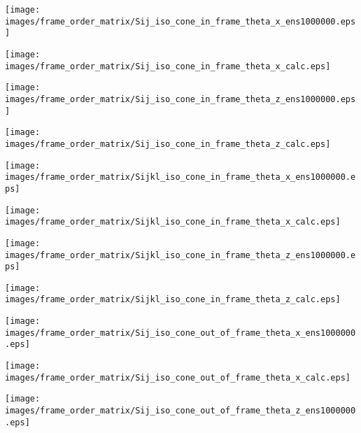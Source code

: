 \documentclass[a4paper,11pt,twoside,openright]{book}
\def\lthtmlcheckvsize{\ifdim\ht\sizebox<\vsize 
  \ifdim\wd\sizebox<\hsize\expandafter\hfill\fi \expandafter\vfill
  \else\expandafter\vss\fi}%
\begin{document}
{\newpage\clearpage
{}%
\texttt{[image: images/frame\_order\_matrix/Sij\_iso\_cone\_in\_frame\_theta\_x\_ens1000000.eps]}%
\lthtmlpictureZ
\lthtmlcheckvsize\clearpage}

{\newpage\clearpage
{}%
\texttt{[image: images/frame\_order\_matrix/Sij\_iso\_cone\_in\_frame\_theta\_x\_calc.eps]}%
\lthtmlpictureZ
\lthtmlcheckvsize\clearpage}

{\newpage\clearpage
{}%
\texttt{[image: images/frame\_order\_matrix/Sij\_iso\_cone\_in\_frame\_theta\_z\_ens1000000.eps]}%
\lthtmlpictureZ
\lthtmlcheckvsize\clearpage}

{\newpage\clearpage
{}%
\texttt{[image: images/frame\_order\_matrix/Sij\_iso\_cone\_in\_frame\_theta\_z\_calc.eps]}%
\lthtmlpictureZ
\lthtmlcheckvsize\clearpage}

{\newpage\clearpage
{}%
\texttt{[image: images/frame\_order\_matrix/Sijkl\_iso\_cone\_in\_frame\_theta\_x\_ens1000000.eps]}%
\lthtmlpictureZ
\lthtmlcheckvsize\clearpage}

{\newpage\clearpage
{}%
\texttt{[image: images/frame\_order\_matrix/Sijkl\_iso\_cone\_in\_frame\_theta\_x\_calc.eps]}%
\lthtmlpictureZ
\lthtmlcheckvsize\clearpage}

{\newpage\clearpage
{}%
\texttt{[image: images/frame\_order\_matrix/Sijkl\_iso\_cone\_in\_frame\_theta\_z\_ens1000000.eps]}%
\lthtmlpictureZ
\lthtmlcheckvsize\clearpage}

{\newpage\clearpage
{}%
\texttt{[image: images/frame\_order\_matrix/Sijkl\_iso\_cone\_in\_frame\_theta\_z\_calc.eps]}%
\lthtmlpictureZ
\lthtmlcheckvsize\clearpage}

{\newpage\clearpage
{}%
\texttt{[image: images/frame\_order\_matrix/Sij\_iso\_cone\_out\_of\_frame\_theta\_x\_ens1000000.eps]}%
\lthtmlpictureZ
\lthtmlcheckvsize\clearpage}

{\newpage\clearpage
{}%
\texttt{[image: images/frame\_order\_matrix/Sij\_iso\_cone\_out\_of\_frame\_theta\_x\_calc.eps]}%
\lthtmlpictureZ
\lthtmlcheckvsize\clearpage}

{\newpage\clearpage
{}%
\texttt{[image: images/frame\_order\_matrix/Sij\_iso\_cone\_out\_of\_frame\_theta\_z\_ens1000000.eps]}%
\lthtmlpictureZ
\lthtmlcheckvsize\clearpage}
\end{document}
